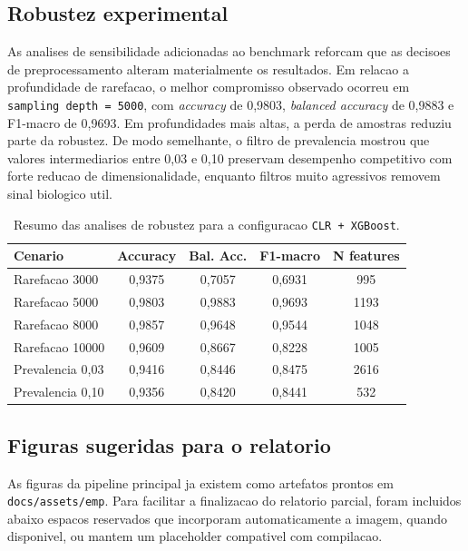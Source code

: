 \documentclass[12pt,a4paper]{article}
\begin{document}
\subsection{Robustez experimental}

As analises de sensibilidade adicionadas ao benchmark reforcam que as decisoes de preprocessamento alteram materialmente os resultados. Em relacao a profundidade de rarefacao, o melhor compromisso observado ocorreu em \texttt{sampling depth = 5000}, com \textit{accuracy} de 0,9803, \textit{balanced accuracy} de 0,9883 e F1-macro de 0,9693. Em profundidades mais altas, a perda de amostras reduziu parte da robustez. De modo semelhante, o filtro de prevalencia mostrou que valores intermediarios entre 0,03 e 0,10 preservam desempenho competitivo com forte reducao de dimensionalidade, enquanto filtros muito agressivos removem sinal biologico util.

\begin{table}[H]
    \centering
    \caption{Resumo das analises de robustez para a configuracao \texttt{CLR + XGBoost}.}
    \label{tab:robustez_emp}
    \begin{tabular}{>{\raggedright\arraybackslash}p{3.0cm} c c c c}
        \toprule
        \textbf{Cenario} & \textbf{Accuracy} & \textbf{Bal. Acc.} & \textbf{F1-macro} & \textbf{N features} \\
        \midrule
        Rarefacao 3000 & 0,9375 & 0,7057 & 0,6931 & 995 \\
        Rarefacao 5000 & 0,9803 & 0,9883 & 0,9693 & 1193 \\
        Rarefacao 8000 & 0,9857 & 0,9648 & 0,9544 & 1048 \\
        Rarefacao 10000 & 0,9609 & 0,8667 & 0,8228 & 1005 \\
        Prevalencia 0,03 & 0,9416 & 0,8446 & 0,8475 & 2616 \\
        Prevalencia 0,10 & 0,9356 & 0,8420 & 0,8441 & 532 \\
        \bottomrule
    \end{tabular}
\end{table}

\subsection{Figuras sugeridas para o relatorio}

As figuras da pipeline principal ja existem como artefatos prontos em \texttt{docs/assets/emp}. Para facilitar a finalizacao do relatorio parcial, foram incluidos abaixo espacos reservados que incorporam automaticamente a imagem, quando disponivel, ou mantem um placeholder compativel com compilacao.
\end{document}
